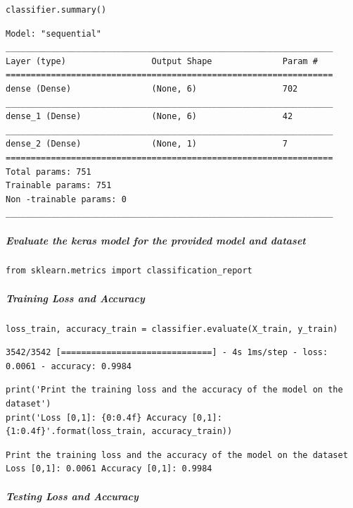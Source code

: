 \begin{verbatim}
classifier.summary()
\end{verbatim}

\begin{verbatim}
Model: "sequential"
_________________________________________________________________
Layer (type)                 Output Shape              Param #   
=================================================================
dense (Dense)                (None, 6)                 702       
_________________________________________________________________
dense_1 (Dense)              (None, 6)                 42        
_________________________________________________________________
dense_2 (Dense)              (None, 1)                 7         
=================================================================
Total params: 751
Trainable params: 751
Non -trainable params: 0
_________________________________________________________________
\end{verbatim}

\subparagraph{Evaluate the keras model for the provided model and dataset}

\begin{verbatim}
from sklearn.metrics import classification_report
\end{verbatim}

\subparagraph{Training Loss and Accuracy}

\begin{verbatim}
loss_train, accuracy_train = classifier.evaluate(X_train, y_train)
\end{verbatim}

\begin{verbatim}
3542/3542 [==============================] - 4s 1ms/step - loss: 0.0061 - accuracy: 0.9984
\end{verbatim}

\begin{verbatim}
print('Print the training loss and the accuracy of the model on the dataset')
print('Loss [0,1]: {0:0.4f} Accuracy [0,1]: {1:0.4f}'.format(loss_train, accuracy_train))
\end{verbatim}

\begin{verbatim}
Print the training loss and the accuracy of the model on the dataset
Loss [0,1]: 0.0061 Accuracy [0,1]: 0.9984
\end{verbatim}

\subparagraph{Testing Loss and Accuracy}

